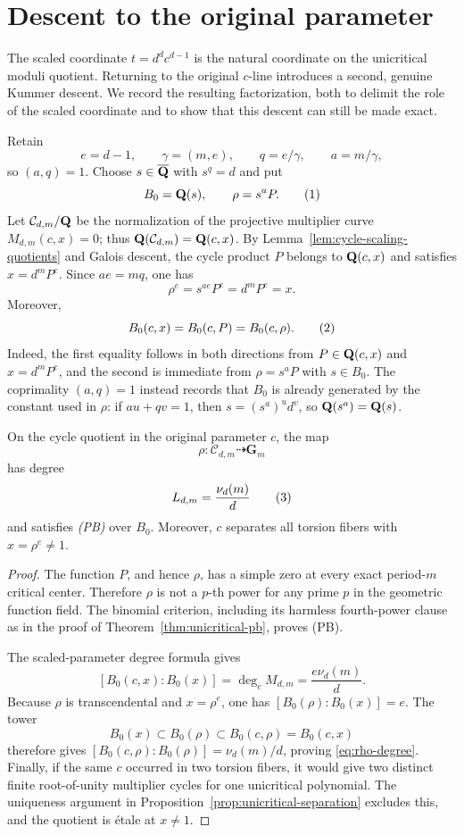 \section{Descent to the original parameter}
\label{sec:original-parameter}

The scaled coordinate $t=d^dc^{d-1}$ is the natural coordinate on the
unicritical moduli quotient.  Returning to the original $c$-line
introduces a second, genuine Kummer descent.  We record the resulting
factorization, both to delimit the role of the scaled coordinate and to
show that this descent can still be made exact.

Retain
\[
 e=d-1,\qquad \gamma=(m,e),\qquad
 q=e/\gamma,\qquad a=m/\gamma,
\]
so $(a,q)=1$.  Choose $s\in\overline{\mathbf Q}$ with $s^q=d$ and put
\[
 B_0=\Q(s),\qquad \rho=s^aP.
 \numberthis\label{eq:rho-definition}
\]
Let $\mathcal C_{d,m}/\mathbf Q$ be the normalization of the projective
multiplier curve $M_{d,m}(c,x)=0$; thus
$\mathbf Q(\mathcal C_{d,m})=\mathbf Q(c,x)$.  By
Lemma~\ref{lem:cycle-scaling-quotients} and Galois descent, the cycle
product $P$ belongs to $\mathbf Q(c,x)$ and satisfies $x=d^mP^e$.  Since
$ae=mq$, one has
\[
 \rho^e=s^{ae}P^e=d^mP^e=x.
\]
Moreover,
\[
 B_0(c,x)=B_0(c,P)=B_0(c,\rho).
 \numberthis\label{eq:rho-field}
\]
Indeed, the first equality follows in both directions from
$P\in\mathbf Q(c,x)$ and $x=d^mP^e$, and the second is immediate from
$\rho=s^aP$ with $s\in B_0$.  The coprimality $(a,q)=1$ instead records
that $B_0$ is already generated by the constant used in $\rho$:
if $au+qv=1$, then $s=(s^a)^u d^v$, so $\mathbf Q(s^a)=\mathbf Q(s)$.

\begin{proposition}
\label{prop:rho-pb}
On the cycle quotient in the original parameter $c$, the map
\[
 \rho:\mathcal C_{d,m}\dashrightarrow\mathbf G_m
\]
has degree
\[
 L_{d,m}=\frac{\nu_d(m)}d
 \numberthis\label{eq:rho-degree}
\]
and satisfies \emph{(PB)} over $B_0$.  Moreover, $c$ separates all
torsion fibers with $x=\rho^e\ne1$.
\end{proposition}

\begin{proof}
The function $P$, and hence $\rho$, has a simple zero at every exact
period-$m$ critical center.  Therefore $\rho$ is not a $p$-th power for
any prime $p$ in the geometric function field.  The binomial criterion,
including its harmless fourth-power clause as in the proof of
Theorem~\ref{thm:unicritical-pb}, proves (PB).

The scaled-parameter degree formula gives
\[
 [B_0(c,x):B_0(x)]=\deg_cM_{d,m}=\frac{e\nu_d(m)}d.
\]
Because $\rho$ is transcendental and $x=\rho^e$, one has
$[B_0(\rho):B_0(x)]=e$.  The tower
\[
 B_0(x)\subset B_0(\rho)\subset B_0(c,\rho)=B_0(c,x)
\]
therefore gives
$[B_0(c,\rho):B_0(\rho)]=\nu_d(m)/d$, proving
\eqref{eq:rho-degree}.  Finally, if the same $c$ occurred in
two torsion fibers, it would give two distinct finite root-of-unity
multiplier cycles for one unicritical polynomial.  The uniqueness
argument in Proposition~\ref{prop:unicritical-separation} excludes
this, and the quotient is \'etale at $x\ne1$.
\end{proof}

